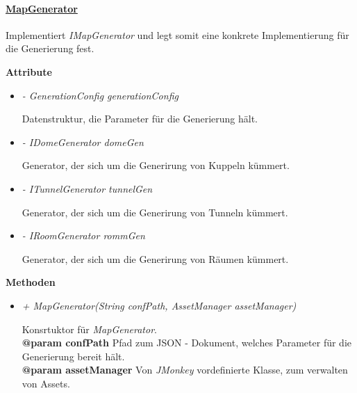     
    
        \paragraph{\underline{MapGenerator}} \mbox{}\par
            Implementiert \textit{IMapGenerator} und legt somit eine konkrete Implementierung für die Generierung fest.\par
            
            \textbf{Attribute}
            \begin{itemize}
                \item  \textit{- GenerationConfig generationConfig} 
                    \begin{leftbar}[0.9\linewidth]
                        Datenstruktur, die Parameter für die Generierung hält.
                    \end{leftbar}
                \item  \textit{- IDomeGenerator domeGen} 
                    \begin{leftbar}[0.9\linewidth]
                        Generator, der sich um die Generirung von Kuppeln kümmert.
                    \end{leftbar}
                \item  \textit{- ITunnelGenerator tunnelGen} 
                    \begin{leftbar}[0.9\linewidth]
                        Generator, der sich um die Generirung von Tunneln kümmert.
                    \end{leftbar}
                \item  \textit{- IRoomGenerator rommGen} 
                    \begin{leftbar}[0.9\linewidth]
                        Generator, der sich um die Generirung von Räumen kümmert.
                    \end{leftbar}
            \end{itemize}

            \textbf{Methoden}					
            \begin{itemize}
                \item  \textit{+ MapGenerator(String confPath, AssetManager assetManager)}
                    \begin{leftbar}[0.9\linewidth]
                        Konsrtuktor für \textit{MapGenerator}.\\
                        \textbf{@param confPath} Pfad zum JSON - Dokument, welches Parameter für die Generierung bereit hält.\\
                        \textbf{@param assetManager} Von \textit{JMonkey} vordefinierte Klasse, zum verwalten von Assets.
                    \end{leftbar}  
            \end{itemize}
    
